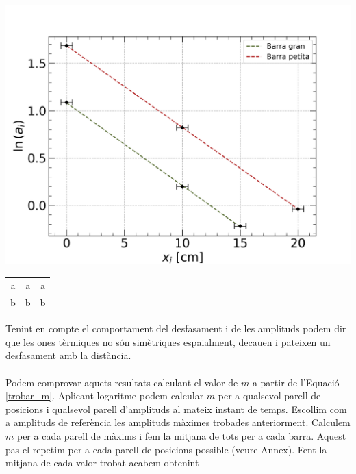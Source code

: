 \documentclass[12pt,twosides,onecolumn,openany]{article}
\newenvironment{Figura}
  {\par\medskip\noindent\minipage{\linewidth}}
  {\endminipage\par\medskip}
\begin{document}
\begin{multicols}{2}
\begin{Figura}
  \centering
  \includegraphics[width=1\linewidth]{../../graphs/practica_Ia/plots/reg_ampli.png}
  \label{fig:reg_lin_amplituds}
\end{Figura}
\begin{Figura}
  \centering
  \begin{tabular}{c|c|c}
    a & a & a \\
    b & b & b 
  \end{tabular}
  \label{tau:pendent_amplituds}
\end{Figura} 
Tenint en compte el comportament del desfasament i de les amplituds podem dir que les ones tèrmiques no són simètriques espaialment, decauen i pateixen un desfasament amb la distància.\\\\
Podem comprovar aquets resultats calculant el valor de $m$ a partir de l'Equació \ref{trobar_m}. Aplicant logaritme podem calcular $m$ per a qualsevol parell de posicions i qualsevol parell d'amplituds al mateix instant de temps. Escollim com a amplituds de referència les amplituds màximes trobades anteriorment. Calculem $m$ per a cada parell de màxims i fem la mitjana de tots per a cada barra. Aquest pas el repetim per a cada parell de posicions possible (veure Annex). Fent la mitjana de cada valor trobat acabem obtenint

\end{multicols}
\end{document}
